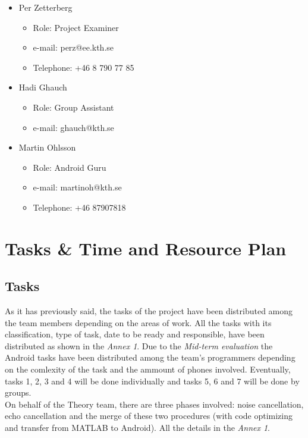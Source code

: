 \documentclass[11pt]{article}
\begin{document}
\begin{itemize}
\item Per Zetterberg
	\begin{itemize}
	\item Role: Project Examiner
	\item e-mail: perz@ee.kth.se
	\item Telephone: +46 8 790 77 85
	\end{itemize}
	
\item Hadi Ghauch
	\begin{itemize}
	\item Role: Group Assistant
	\item e-mail: ghauch@kth.se
	\end{itemize}
	
\item Martin Ohlsson
	\begin{itemize}
	\item Role: Android Guru
	\item e-mail: martinoh@kth.se
	\item Telephone: +46 87907818
	\end{itemize}
\end{itemize}

\section{Tasks \& Time and Resource Plan}

\subsection*{Tasks}
As it has previously said, the tasks of the project have been distributed among the team members depending on the areas of work. All the tasks with its classification, type of task, date to be ready and responsible, have been distributed as shown in the \textit{Annex 1}. Due to the \textit{Mid-term evaluation} the Android tasks have been distributed among the team's programmers depending on the comlexity of the task and the ammount of phones involved. Eventually, tasks 1, 2, 3 and 4 will be done individually and tasks 5, 6 and 7 will be done by groups.\\

On behalf of the Theory team, there are three phases involved: noise cancellation, echo cancellation and the merge of these two procedures (with code optimizing and transfer from MATLAB to Android). All the details in the \textit{Annex 1}.\\
\end{document}
